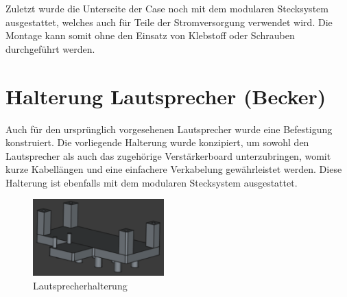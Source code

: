 Zuletzt wurde die Unterseite der Case noch mit dem modularen Stecksystem ausgestattet, welches auch für Teile der Stromversorgung verwendet wird.
Die Montage kann somit ohne den Einsatz von Klebstoff oder Schrauben durchgeführt werden.

\section{Halterung Lautsprecher (Becker) \label{sec:speaker_holder}}

Auch für den ursprünglich vorgesehenen Lautsprecher wurde eine Befestigung konstruiert. 
Die vorliegende Halterung wurde konzipiert, um sowohl den Lautsprecher als auch das zugehörige Verstärkerboard unterzubringen, womit kurze Kabellängen und eine einfachere Verkabelung gewährleistet werden. 
Diese Halterung ist ebenfalls mit dem modularen Stecksystem ausgestattet.

\begin{figure}[H]
    \centering
    \includegraphics[width=0.45\textwidth, keepaspectratio]{images/becker_cad_speaker.png}
    \caption{Lautsprecherhalterung}
\end{figure}
